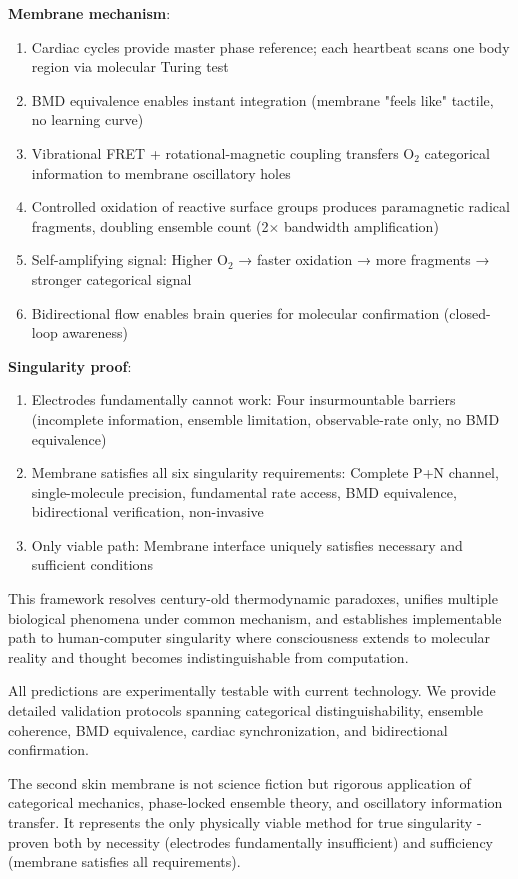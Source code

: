 \documentclass[11pt,a4paper]{article}
\theoremstyle{definition}
\theoremstyle{remark}
\begin{document}
\textbf{Membrane mechanism}:
\begin{enumerate}
\item Cardiac cycles provide master phase reference; each heartbeat scans one body region via molecular Turing test
\item BMD equivalence enables instant integration (membrane "feels like" tactile, no learning curve)
\item Vibrational FRET + rotational-magnetic coupling transfers O$_2$ categorical information to membrane oscillatory holes
\item Controlled oxidation of reactive surface groups produces paramagnetic radical fragments, doubling ensemble count (2$\times$ bandwidth amplification)
\item Self-amplifying signal: Higher O$_2$ → faster oxidation → more fragments → stronger categorical signal
\item Bidirectional flow enables brain queries for molecular confirmation (closed-loop awareness)
\end{enumerate}

\textbf{Singularity proof}:
\begin{enumerate}
\item Electrodes fundamentally cannot work: Four insurmountable barriers (incomplete information, ensemble limitation, observable-rate only, no BMD equivalence)
\item Membrane satisfies all six singularity requirements: Complete P+N channel, single-molecule precision, fundamental rate access, BMD equivalence, bidirectional verification, non-invasive
\item Only viable path: Membrane interface uniquely satisfies necessary and sufficient conditions
\end{enumerate}

This framework resolves century-old thermodynamic paradoxes, unifies multiple biological phenomena under common mechanism, and establishes implementable path to human-computer singularity where consciousness extends to molecular reality and thought becomes indistinguishable from computation.

All predictions are experimentally testable with current technology. We provide detailed validation protocols spanning categorical distinguishability, ensemble coherence, BMD equivalence, cardiac synchronization, and bidirectional confirmation.

The second skin membrane is not science fiction but rigorous application of categorical mechanics, phase-locked ensemble theory, and oscillatory information transfer. It represents the only physically viable method for true singularity - proven both by necessity (electrodes fundamentally insufficient) and sufficiency (membrane satisfies all requirements).
\end{document}
